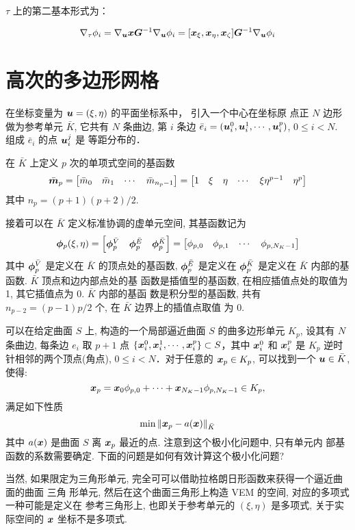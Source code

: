 \documentclass{article}
\begin{document}
$\tau$ 上的第二基本形式为：

\begin{align*}
    \nabla_\tau \phi_i = 
    \nabla_{\boldsymbol u} {\boldsymbol x} {\boldsymbol G}^{-1} \nabla_{\boldsymbol u} \phi_i =
    [{\boldsymbol x}_\xi, {\boldsymbol x}_\eta, {\boldsymbol x}_\zeta] {\boldsymbol G}^{-1} \nabla_{\boldsymbol u} \phi_i
\end{align*}
\cite{fealpy}

\newpage

\section{高次的多边形网格}


在坐标变量为 ${\boldsymbol u} = (\xi, \eta)$ 的平面坐标系中， 引入一个中心在坐标原
点正 $N$ 边形做为参考单元 $\bar K$, 它共有 $N$ 条曲边, 第 $i$ 条边 $\bar e_i = ({\boldsymbol u}_i^0,
{\boldsymbol u}_i^1, \cdots, {\boldsymbol u}_i^p)$, $0\leq i < N$. 组成 $\bar e_i$ 的点 ${\boldsymbol u}_i^j$ 是
等距分布的．

在 $\bar K$ 上定义 $p$ 次的单项式空间的基函数　
$$
\bar{{\boldsymbol m}}_p =
\begin{bmatrix} 
    \bar m_0 & \bar m_1 & \cdots & \bar m_{n_p-1}
\end{bmatrix} 
= 
\begin{bmatrix} 
    1 & \xi & \eta & \cdots & \xi\eta^{p-1} & \eta^p
\end{bmatrix}
$$
其中 $n_p = (p+1)(p+2)/2$. 

接着可以在 $\bar K$ 定义标准协调的虚单元空间, 其基函数记为
$$
{\bm \phi}_p(\xi, \eta) = 
\begin{bmatrix} 
    {\bm \phi}_p^{\bar V} & {\bm \phi}_p^{\bar E} & {\bm \phi}_p^{\bar K}
\end{bmatrix} 
= 
\begin{bmatrix} 
    \phi_{p, 0} & \phi_{p, 1} & \cdots & \phi_{p, N_K-1}
\end{bmatrix}
$$
其中 ${\bm \phi}_p^{\bar V}$ 是定义在 $\bar K$ 的顶点处的基函数, ${\bm \phi}_p^{\bar E}$ 是定义在
${\bm \phi}_p^{\bar K}$ 是定义在 $\bar K$ 内部的基函数. $\bar K$ 顶点和边内部点处的基
函数是插值型的基函数, 在相应插值点处的取值为 1, 其它插值点为 0. $\bar K$ 内部的基函
数是积分型的基函数, 共有 $n_{p-2} = (p-1)p/2$ 个, 在 $\bar K$ 边界上的插值点取值
为 0.

可以在给定曲面 $S$ 上, 构造的一个局部逼近曲面 $S$ 的曲多边形单元 $K_p$, 设其有 $N$ 条曲边, 每条边 $e_i$ 取 $p+1$ 点
$\{{\boldsymbol x}_i^0, {\boldsymbol x}_i^1, \cdots, {\boldsymbol x}_i^p\}\subset S$，其中 ${\boldsymbol x}_i^0$ 和 ${\boldsymbol x}_i^p$
是 $K_p$ 逆时针相邻的两个顶点(角点), $0\leq i < N$．对于任意的 ${\boldsymbol x}_p \in K_p$,  可以找到一个 ${\boldsymbol u} \in \bar K$, 使得:
$$
{\boldsymbol x}_p = {\boldsymbol x}_0\phi_{p, 0} + \cdots + {\boldsymbol x}_{N_K-1}\phi_{p, N_K-1} \in K_p,
$$
满足如下性质 
$$
\min \|{\boldsymbol x}_p - a({\boldsymbol x})\|_{\bar K}
$$
其中 $a({\boldsymbol x})$ 是曲面 $S$ 离 ${\boldsymbol x}_p$ 最近的点. 注意到这个极小化问题中, 只有单元内
部基函数的系数需要确定. 下面的问题是如何有效计算这个极小化问题?


当然, 如果限定为三角形单元, 完全可可以借助拉格朗日形函数来获得一个逼近曲面的曲面
三角 形单元, 然后在这个曲面三角形上构造 VEM 的空间, 对应的多项式一种可能是定义在
参考三角形上, 也即关于参考单元的 $(\xi, \eta)$ 是多项式, 关于实际空间的 ${\boldsymbol x}$
坐标不是多项式.








\end{document}
